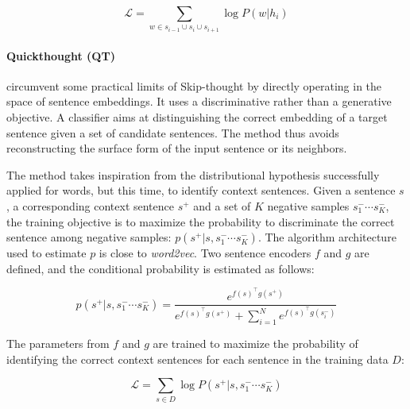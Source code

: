 \begin{equation*}
    \mathcal{L} = \sum_{w \in s_{i-1} \cup s_{i} \cup s_{i+1}} \log P(w | h_i)
\end{equation*}

\paragraph{Quickthought (QT)} \textcite{logeswaran_18} circumvent some practical limits of Skip-thought by directly operating in the space of sentence embeddings. It uses a discriminative rather than a generative objective. A classifier aims at distinguishing the correct embedding of a target sentence given a set of candidate sentences. The method thus avoids reconstructing the surface form of the input sentence or its neighbors.

The method takes inspiration from the distributional hypothesis successfully applied for words, but this time, to identify context sentences. Given a sentence $s$, a corresponding context sentence $s^+$ and a set of $K$ negative samples $s^-_1 \cdots s^-_K$, the training objective is to maximize the probability to discriminate the correct sentence among negative samples: $p(s^+ | s, s^-_1 \cdots s^-_K)$. The algorithm architecture used to estimate $p$ is close to \textsl{word2vec}. Two sentence encoders $f$ and $g$ are defined, and the conditional probability is estimated as follows:


\begin{equation*}
    p(s^+ | s, s^-_1 \cdots s^-_K) = \frac{e^{f(s)^{\top}g(s^+)}}{e^{f(s)^{\top}g(s^+)}+\sum_{i=1}^Ne^{f(s)^{\top}g(s^-_i)}}    
\end{equation*}

The parameters from $f$ and $g$ are trained to maximize the probability of identifying the correct context sentences for each sentence in the training data $D$:

\begin{equation*}
    \mathcal{L} = \sum_{s \in D} \log P(s^+ | s, s^-_1 \cdots s^-_K)
\end{equation*}

